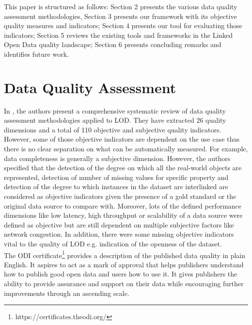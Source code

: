 \documentclass[onecolumn, crcready]{iosart2c}
\begin{document}
This paper is structured as follows: Section 2 presents the various data quality assessment methodologies, Section 3 presents our framework with its objective quality measures and indicators; Section 4 presents our tool for evaluating those indicators; Section 5 reviews the existing tools and frameworks in the Linked Open Data quality landscape; Section 6 presents concluding remarks and identifies future work.

\section{Data Quality Assessment}

In \cite{Framework2012}, the authors present a comprehensive systematic review of data quality assessment methodologies applied to LOD. They have extracted 26 quality dimensions and a total of 110 objective and subjective quality indicators. However, some of those objective indicators are dependent on the use case thus there is no clear separation on what can be automatically measured. For example, data completeness is generally a subjective dimension. However, the authors specified that the detection of the degree on which all the real-world objects are represented, detection of number of missing values for specific property and detection of the degree to which instances in the dataset are interlinked are considered as objective indicators given the presence of a gold standard or the original data source to compare with. Moreover, lots of the defined performance dimensions like low latency, high throughput or scalability of a data source were defined as objective but are still dependent on multiple subjective factors like network congestion. In addition, there were some missing objective indicators vital to the quality of LOD e.g. indication of the openness of the dataset.\\

The ODI certificate\footnote {https://certificates.theodi.org/} provides a description of the published data quality in plain English. It aspires to act as a mark of approval that helps publishers understand how to publish good open data and users how to use it. It gives publishers the ability to provide assurance and support on their data while encouraging further improvements through an ascending scale.
\end{document}
